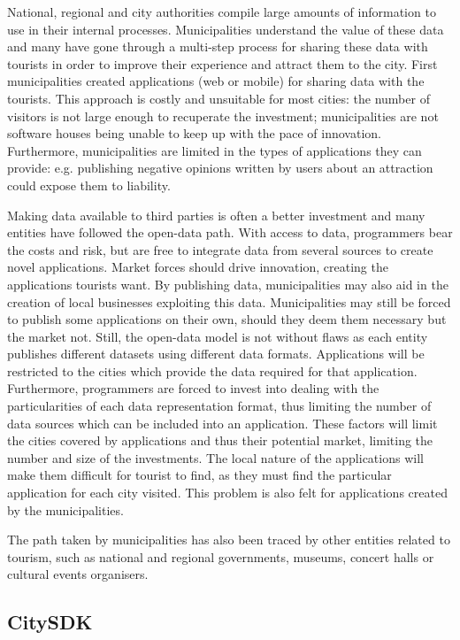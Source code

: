 \documentclass[times]{ettauth}
\begin{document}
National, regional and city authorities compile large amounts of information to use in their internal processes.
Municipalities understand the value of these data and many have gone through a multi-step process for sharing these data with tourists in order to improve their experience and attract them to the city.
First municipalities created applications (web or mobile) for sharing data with the tourists.
This approach is costly and unsuitable for most cities: the number of visitors is not large enough to recuperate the investment; municipalities are not software houses being unable to keep up with the pace of innovation. 
Furthermore, municipalities are limited in the types of applications they can provide: e.g. publishing negative opinions written by users about an attraction could expose them to liability.

Making data available to third parties is often a better investment and many entities have followed the open-data path.
With access to data, programmers bear the costs and risk, but are free to integrate data from several sources to create novel applications.
Market forces should drive innovation, creating the applications tourists want.
By publishing data, municipalities may also aid in the creation of local businesses exploiting this data.
Municipalities may still be forced to publish some applications on their own, should they deem them necessary but the market not. 
Still, the open-data model is not without flaws as each entity publishes different datasets using different data formats.
Applications will be restricted to the cities which provide the data required for that application.
Furthermore, programmers are forced to invest into dealing with the particularities of each data representation format, thus limiting the number of data sources which can be included into an application.
These factors will limit the cities covered by applications and thus their potential market, limiting the number and size of the investments.
The local nature of the applications will make them difficult for tourist to find, as they must find the particular application for each city visited.
This problem is also felt for applications created by the municipalities.

The path taken by municipalities has also been traced by other entities related to tourism, such as national and regional governments, museums, concert halls or cultural events organisers.

\subsection{CitySDK}
\label{s:citysdk}
\end{document}
